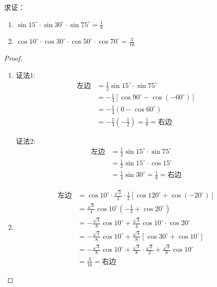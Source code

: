 \begin{example}
求证：
\begin{enumerate}
    \item $\sin15^{\circ} \cdot \sin30^{\circ} \cdot \sin75^{\circ} =\frac{1}{8}$
   \item  $\cos10^{\circ} \cdot \cos30^{\circ} \cdot \cos50^{\circ} \cdot \cos70^{\circ} =\frac{3}{16}$
\end{enumerate}    
\end{example}

\begin{proof}
\begin{enumerate}
    \item 证法1:
\[\begin{split}
\text{左边}&=\frac{1}{2}\sin 15^{\circ}\cdot \sin 75^{\circ}\\
&=-\frac{1}{4}[\cos 90^{\circ}-\cos(-60^{\circ})]\\
&=-\frac{1}{4}(0-\cos60^{\circ})\\
&=-\frac{1}{4}\left(-\frac{1}{2}\right)=\frac{1}{8}=\text{右边}    
\end{split}\]

证法2:
\[\begin{split}
\text{左边}&=\frac{1}{2}\sin 15^{\circ}\cdot \sin 75^{\circ}\\
&=\frac{1}{2}\sin 15^{\circ}\cdot \cos15^{\circ}\\
&=\frac{1}{4}\sin 30^{\circ}=\frac{1}{8}=\text{右边}    
\end{split}\]

\item 
\[\begin{split}
\text{左边}&=\cos 10^{\circ}\cdot \frac{\sqrt{3}}{2}\cdot \frac{1}{2}[\cos 120^{\circ}+\cos(-20^{\circ})]\\
&=\frac{\sqrt{3}}{4}\cos 10^{\circ}\left(-\frac{1}{2}+\cos20^{\circ}\right)\\ 
&=-\frac{\sqrt{3}}{8}\cos 10^{\circ}+\frac{\sqrt{3}}{4}\cos 10^{\circ}\cdot \cos 20^{\circ}\\
&=-\frac{\sqrt{3}}{8}\cos 10^{\circ}+\frac{\sqrt{3}}{8}[\cos30^{\circ}+\cos10^{\circ}]\\
&=-\frac{\sqrt{3}}{8}\cos 10^{\circ}+\frac{\sqrt{3}}{8}\cdot \frac{\sqrt{3}}{2}+\frac{\sqrt{3}}{8}\cos 10^{\circ}\\
&=\frac{3}{16}=\text{右边}
\end{split}\]
\end{enumerate}
\end{proof}

